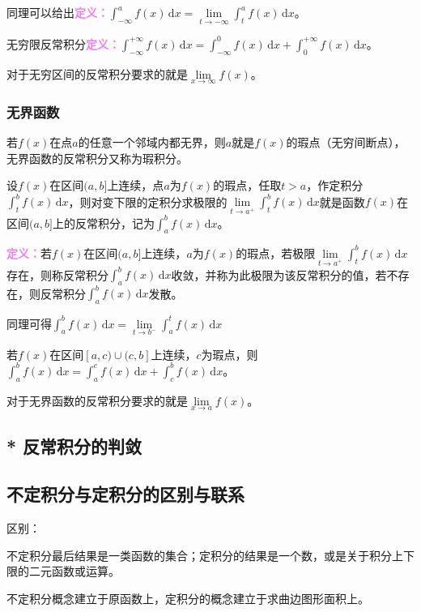 \documentclass[UTF8, 12pt]{ctexart}
\begin{document}
同理可以给出\textcolor{violet}{\textbf{定义：}}$\int_{-\infty}^af(x)\,\textrm{d}x=\lim\limits_{t\to-\infty}\int_t^af(x)\,\textrm{d}x$。

无穷限反常积分\textcolor{violet}{\textbf{定义：}}$\int_{-\infty}^{+\infty}f(x)\,\textrm{d}x=\int_{-\infty}^0f(x)\,\textrm{d}x+\int_0^{+\infty}f(x)\,\textrm{d}x$。

对于无穷区间的反常积分要求的就是$\lim\limits_{x\to\infty}f(x)$。

\subsubsection{无界函数}

若$f(x)$在点$a$的任意一个邻域内都无界，则$a$就是$f(x)$的瑕点（无穷间断点），无界函数的反常积分又称为瑕积分。

设$f(x)$在区间$(a,b]$上连续，点$a$为$f(x)$的瑕点，任取$t>a$，作定积分$\int_t^bf(x)\,\textrm{d}x$，则对变下限的定积分求极限的$\lim\limits_{t\to a^+}\int_t^bf(x)\,\textrm{d}x$就是函数$f(x)$在区间$(a,b]$上的反常积分，记为$\int_a^bf(x)\,\textrm{d}x$。

\textcolor{violet}{\textbf{定义：}}若$f(x)$在区间$(a,b]$上连续，$a$为$f(x)$的瑕点，若极限$\lim\limits_{t\to a^+}\int_t^bf(x)\,\textrm{d}x$存在，则称反常积分$\int_a^bf(x)\,\textrm{d}x$收敛，并称为此极限为该反常积分的值，若不存在，则反常积分$\int_a^bf(x)\,\textrm{d}x$发散。

同理可得$\int_a^bf(x)\,\textrm{d}x=\lim\limits_{t\to b^-}\int_a^tf(x)\,\textrm{d}x$

若$f(x)$在区间$[a,c)\cup(c,b]$上连续，$c$为瑕点，则$\int_a^bf(x)\,\textrm{d}x=\int_a^cf(x)\,\textrm{d}x+\int_c^bf(x)\,\textrm{d}x$。

对于无界函数的反常积分要求的就是$\lim\limits_{x\to a}f(x)$。

\subsection{* 反常积分的判敛}

\subsection{不定积分与定积分的区别与联系}

区别：

不定积分最后结果是一类函数的集合；定积分的结果是一个数，或是关于积分上下限的二元函数或运算。

不定积分概念建立于原函数上，定积分的概念建立于求曲边图形面积上。
\end{document}

